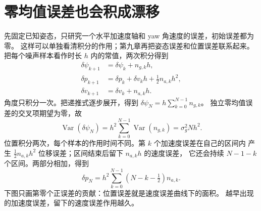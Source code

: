 \section{零均值误差也会积成漂移}
先固定已知姿态，只研究一个水平加速度轴和 yaw 角速度的误差，初始误差都为零。
这样可以单独看清积分的作用；第九章再把姿态误差和位置误差联系起来。
把每个噪声样本看作时长 $h$ 内的常值，两次积分得到
\begin{align}
\delta\psi_{k+1}&=\delta\psi_k+n_{g,k}h,\\
\delta p_{k+1}&=\delta p_k+\delta v_kh+\tfrac12 n_{a,k}h^2,\\
\delta v_{k+1}&=\delta v_k+n_{a,k}h.
\end{align}
角度只积分一次。把递推式逐步展开，得到 $\delta\psi_N=h\sum_{k=0}^{N-1}n_{g,k}$。
独立零均值误差的交叉项期望为零，故
\begin{equation}
\operatorname{Var}(\delta\psi_N)=h^2\sum_{k=0}^{N-1}\operatorname{Var}(n_{g,k})
=\sigma_g^2Nh^2.
\end{equation}
位置积分两次，每个样本的作用时间不同。第 $k$ 个加速度误差在自己的区间内
产生 $\tfrac12 n_{a,k}h^2$ 位移误差；区间结束后留下 $n_{a,k}h$ 的速度误差，
它还会持续 $N-1-k$ 个区间。两部分相加，得到
\begin{equation}
\delta p_N=h^2\sum_{k=0}^{N-1}(N-k-\tfrac12)n_{a,k}.
\end{equation}
下图只画第零个正误差的贡献：位置误差就是速度误差曲线下的面积。
越早出现的加速度误差，留下的速度误差作用越久。
\begin{center}
\end{center}

